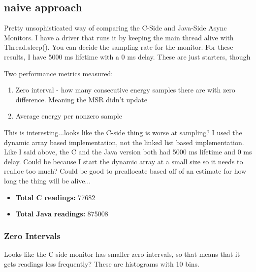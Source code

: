 \documentclass{article}
\begin{document}
\subsection{naive approach}
Pretty unsophisticated way of comparing the C-Side and Java-Side Async Monitors. I have a driver that runs it
by keeping the main thread alive with Thread.sleep(). You can decide the sampling rate for the monitor. For these
results, I have 5000 ms lifetime with a 0 ms delay. These are just starters, though

Two performance metrics measured:
\begin{enumerate}
    \item Zero interval - how many consecutive energy samples there are with zero difference. Meaning the MSR didn't update
    \item Average energy per nonzero sample
\end{enumerate}

This is interesting...looks like the C-side thing is worse at sampling? I used the dynamic array based implementation,
not the linked list based implementation. Like I said above, the C and the Java version both had 5000 ms lifetime
and 0 ms delay. Could be because I start the dynamic array at a small size so it needs to realloc too much? Could
be good to preallocate based off of an estimate for how long the thing will be alive...
\begin{itemize}
    \item \textbf{Total C readings:}	77682
    \item \textbf{Total Java readings:}	875008
\end{itemize}


\subsubsection{Zero Intervals}
    Looks like the C side monitor has smaller zero intervals, so that means that it gets readings less frequently?
    These are histograms with 10 bins.
\end{document}
